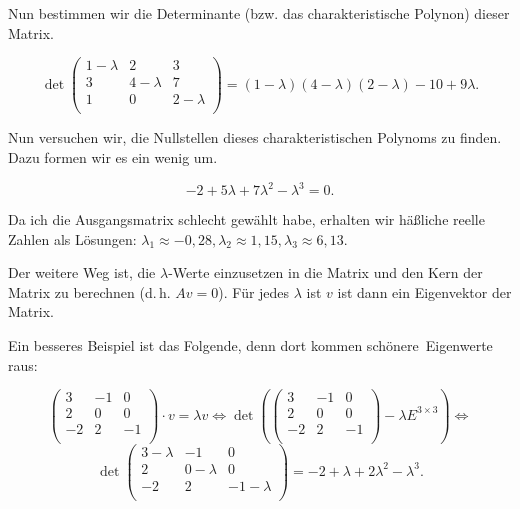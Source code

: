 \documentclass{scrartcl}
\begin{document}
Nun bestimmen wir die Determinante (bzw. das charakteristische Polynon) dieser Matrix.

\begin{equation}
	\det\begin{pmatrix*}
		1 -\lambda	& 2		& 3		\\
		3		& 4 -\lambda	& 7		\\
		1		& 0		& 2 -\lambda	\\
	\end{pmatrix*} =
       	(1 - \lambda)(4 -  \lambda)(2 -  \lambda) - 10 + 9 \lambda.
\end{equation}

Nun versuchen wir, die Nullstellen dieses charakteristischen Polynoms zu finden. Dazu formen wir es ein wenig um.

\begin{equation}
	-2 + 5\lambda +7\lambda^2 - \lambda^3 = 0.
\end{equation}

Da ich die Ausgangsmatrix schlecht gewählt habe, erhalten wir häßliche reelle Zahlen als Lösungen: 
$\lambda_1 \approx -0,28, \lambda_2 \approx 1,15, \lambda_3 \approx 6,13$.

Der weitere Weg ist, die $\lambda$-Werte einzusetzen in die Matrix und den Kern der Matrix zu berechnen
(d.\,h. $Av = 0$). Für jedes $\lambda$ ist $v$ ist dann ein Eigenvektor der Matrix.

Ein besseres Beispiel ist das Folgende, denn dort kommen \frq schönere\flq\ Eigenwerte raus:

\begin{equation}
	\begin{pmatrix*}
		3 & -1 & 0 \\
		2 & 0 & 0 \\
		-2 & 2 & -1 \\
	\end{pmatrix*} \cdot v = \lambda v
	\Leftrightarrow
	\det\left(\begin{pmatrix*}
		3 & -1 & 0 \\
		2 & 0 & 0 \\
		-2 & 2 & -1 \\
	\end{pmatrix*} - \lambda E^{3\times 3}\right)
	\Leftrightarrow
\end{equation}
\begin{equation}
	\det\begin{pmatrix*}
		3 - \lambda	& -1		& 0		\\
		2		& 0 - \lambda	& 0		\\
		-2		& 2		& -1 - \lambda	\\
	\end{pmatrix*} =  -2 + \lambda +2\lambda^2 - \lambda^3.
\end{equation}
\end{document}
